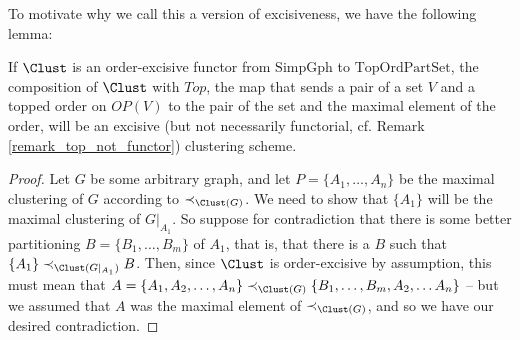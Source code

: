 \documentclass[a4paper,reqno,oneside]{article} %
\begin{document}
To motivate why we call this a version of excisiveness, we have the following lemma:
\begin{lemma}
If $\Clust$ is an order-excisive functor from $\mathrm{SimpGph}$ to $\mathrm{TopOrdPartSet}$, the composition of $\Clust$ with $Top$, the map that sends a pair of a set $V$ and a topped order on $OP(V)$ to the pair of the set and the maximal element of the order, will be an excisive (but not necessarily functorial, cf. Remark \ref{remark_top_not_functor}) clustering scheme.
\begin{proof}
Let $G$ be some arbitrary graph, and let $P = \{A_1, \ldots, A_n\}$ be the maximal clustering of $G$ according to $\prec_{\Clust(G)}$. We need to show that $\{A_1\}$ will be the maximal clustering of $G|_{A_1}$. So suppose for contradiction that there is some better partitioning $B = \{B_1, \ldots, B_m\}$ of $A_1$, that is, that there is a $B$ such that $\{A_1\} \prec_{\Clust(G|_{A_1})} B$. Then, since $\Clust$ is order-excisive by assumption, this must mean that $A = \{A_1, A_2, \ldots, A_n\} \prec_{\Clust(G)} \{B_1, \ldots, B_m, A_2,\ldots A_n\}$ -- but we assumed that $A$ was the maximal element of $\prec_{\Clust(G)}$, and so we have our desired contradiction.
\end{proof}
\end{lemma}

\printbibliography
\end{document}
